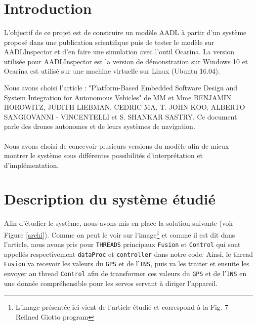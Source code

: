 \documentclass[a4paper,12pt]{report}
\begin{document}
	\newpage\renewcommand{\contentsname}{Sommaire}
	\tableofcontents

	\newpage
	\section{Introduction}
		\paragraph*{}
		L'objectif de ce projet est de construire un modèle AADL à partir d'un système proposé dans une publication scientifique puis de tester le modèle sur AADLInspector et d'en faire une simulation avec l'outil Ocarina. La version utilisée pour AADLInspector est la version de démonstration sur Windows 10 et Ocarina est utilisé sur une machine virtuelle sur Linux (Ubuntu 16.04).
		
		Nous avons choisi l'article : "Platform-Based Embedded Software Design and System Integration for Autonomous Vehicles" de MM et Mme BENJAMIN HOROWITZ, JUDITH LIEBMAN, CEDRIC MA, T. JOHN KOO, ALBERTO SANGIOVANNI - VINCENTELLI et S. SHANKAR SASTRY. Ce document parle des drones autonomes et de leurs systèmes de navigation.
		
		\paragraph*{}
		Nous avons choisi de concevoir plusieurs versions du modèle afin de mieux montrer le système sous différentes possibilités d'interprétation et d'implémentation.
	
	\section{Description du système étudié}
		\paragraph*{}
		Afin d'étudier le système, nous avons mis en place la solution suivante (voir Figure \ref{archi}). Comme on peut le voir sur l'image\footnote{L'image présentée ici vient de l'article étudié et correspond à la Fig. 7 Refined Giotto program} et comme il est dit dans l'article, nous avons pris pour \texttt{THREADS} principaux \texttt{Fusion} et \texttt{Control} qui sont appellés respectivement \texttt{dataProc} et \texttt{controller} dans notre code. Ainsi, le thread \texttt{Fusion} va recevoir les valeurs du \texttt{GPS} et de l'\texttt{INS}, puis va les traiter et ensuite les envoyer au thread \texttt{Control} afin de transformer ces valeurs du \texttt{GPS} et de l'\texttt{INS} en une donnée compréhensible pour les servos servant à diriger l'appareil.
		
\end{document}
